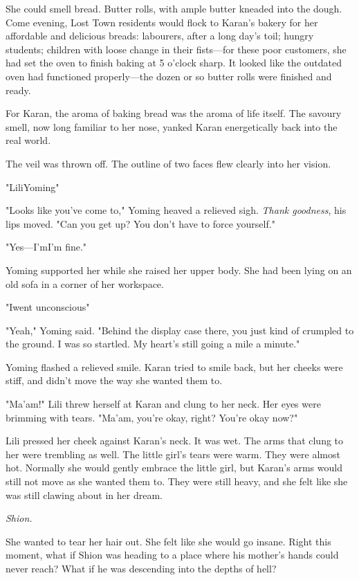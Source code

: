 She could smell bread. Butter rolls, with ample butter kneaded into the
dough. Come evening, Lost Town residents would flock to Karan's bakery
for her affordable and delicious breads: labourers, after a long day's
toil; hungry students; children with loose change in their fists---for
these poor customers, she had set the oven to finish baking at 5 o'clock
sharp. It looked like the outdated oven had functioned properly---the
dozen or so butter rolls were finished and ready.

For Karan, the aroma of baking bread was the aroma of life itself. The
savoury smell, now long familiar to her nose, yanked Karan energetically
back into the real world.

The veil was thrown off. The outline of two faces flew clearly into her
vision.

"Lili\el Yoming\el "

"Looks like you've come to," Yoming heaved a relieved sigh. \emph{Thank
goodness}, his lips moved. "Can you get up? You don't have to force
yourself."

"Yes---I'm\el I'm fine."

Yoming supported her while she raised her upper body. She had been lying
on an old sofa in a corner of her workspace.

"I\el went unconscious\el "

"Yeah," Yoming said. "Behind the display case there, you just kind of
crumpled to the ground. I was so startled. My heart's still going a mile
a minute."

Yoming flashed a relieved smile. Karan tried to smile back, but her
cheeks were stiff, and didn't move the way she wanted them to.

"Ma'am!" Lili threw herself at Karan and clung to her neck. Her eyes
were brimming with tears. "Ma'am, you're okay, right? You're okay now?"

Lili pressed her cheek against Karan's neck. It was wet. The arms that
clung to her were trembling as well. The little girl's tears were warm.
They were almost hot. Normally she would gently embrace the little girl,
but Karan's arms would still not move as she wanted them to. They were
still heavy, and she felt like she was still clawing about in her dream.

\emph{Shion.}

She wanted to tear her hair out. She felt like she would go insane.
Right this moment, what if Shion was heading to a place where his
mother's hands could never reach? What if he was descending into the
depths of hell?

